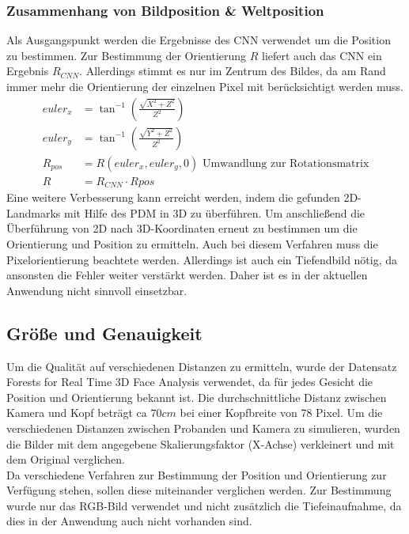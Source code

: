 \subsubsection{Zusammenhang von Bildposition \& Weltposition}
Als Ausgangspunkt werden die Ergebnisse des CNN verwendet um die Position zu bestimmen. Zur Bestimmung der Orientierung $R$ liefert auch das CNN ein Ergebnis $R_{CNN}$. Allerdings stimmt es nur im Zentrum des Bildes, da am Rand immer mehr die Orientierung der einzelnen Pixel mit berücksichtigt werden muss.\\
\begin{align*}
euler_x &= \tan^{-1}(\frac{\sqrt{X^2+Z^2}}{Z^2})\\
euler_y &= \tan^{-1}(\frac{\sqrt{Y^2+Z^2}}{Z^2})\\
R_{pos} &= R(euler_x,euler_y,0)\text{ Umwandlung zur Rotationsmatrix}\\
R &= R_{CNN}\cdot R{pos}
\end{align*}
Eine weitere Verbesserung kann erreicht werden, indem die gefunden 2D-Landmarks mit Hilfe des PDM in 3D zu überführen. Um anschließend die Überführung von 2D nach 3D-Koordinaten erneut zu bestimmen um die Orientierung und Position zu ermitteln. Auch bei diesem Verfahren muss die Pixelorientierung beachtete werden. Allerdings ist auch ein Tiefendbild nötig, da ansonsten die Fehler weiter verstärkt werden. Daher ist es in der aktuellen Anwendung nicht sinnvoll einsetzbar.
\subsection{Größe und Genauigkeit}
Um die Qualität auf verschiedenen Distanzen zu ermitteln, wurde der Datensatz Forests for Real Time 3D Face Analysis \cite{database_Face_Ori} verwendet, da für jedes Gesicht die Position und Orientierung bekannt ist.
Die durchschnittliche Distanz zwischen Kamera und Kopf beträgt ca $70cm$ bei einer Kopfbreite von 78 Pixel. Um die verschiedenen Distanzen zwischen Probanden und Kamera zu simulieren, wurden die Bilder mit dem angegebene Skalierungsfaktor (X-Achse) verkleinert und mit dem Original verglichen.\\
Da verschiedene Verfahren zur Bestimmung der Position und Orientierung zur Verfügung stehen, sollen diese miteinander verglichen werden. Zur Bestimmung wurde nur das RGB-Bild verwendet und nicht zusätzlich die Tiefeinaufnahme, da dies in der Anwendung auch nicht vorhanden sind.
